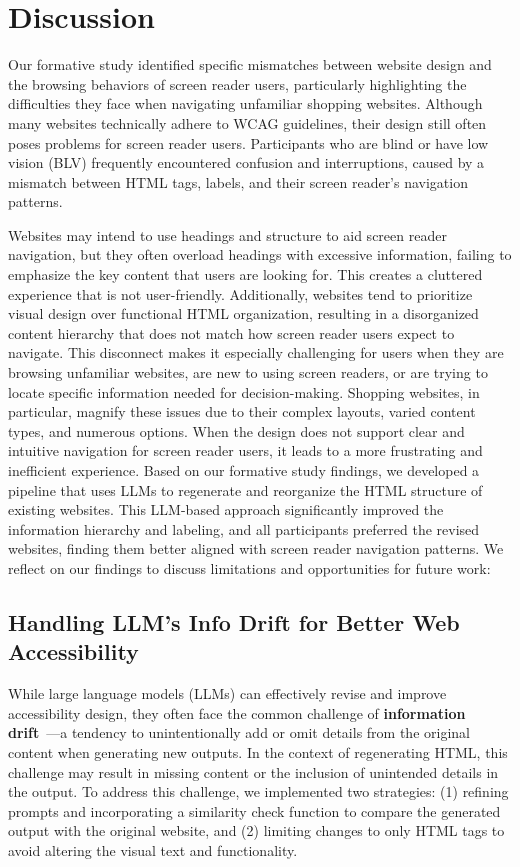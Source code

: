 \section{Discussion}
\label{sec:discuss}



Our formative study identified specific mismatches between website design and the browsing behaviors of screen reader users, particularly highlighting the difficulties they face when navigating unfamiliar shopping websites. Although many websites technically adhere to WCAG guidelines, their design still often poses problems for screen reader users. Participants who are blind or have low vision (BLV) frequently encountered confusion and interruptions, caused by a mismatch between HTML tags, labels, and their screen reader's navigation patterns.

Websites may intend to use headings and structure to aid screen reader navigation, but they often overload headings with excessive information, failing to emphasize the key content that users are looking for. This creates a cluttered experience that is not user-friendly. Additionally, websites tend to prioritize visual design over functional HTML organization, resulting in a disorganized content hierarchy that does not match how screen reader users expect to navigate. This disconnect makes it especially challenging for users when they are browsing unfamiliar websites, are new to using screen readers, or are trying to locate specific information needed for decision-making. Shopping websites, in particular, magnify these issues due to their complex layouts, varied content types, and numerous options. When the design does not support clear and intuitive navigation for screen reader users, it leads to a more frustrating and inefficient experience.
Based on our formative study findings, we developed a pipeline that uses LLMs to regenerate and reorganize the HTML structure of existing websites. This LLM-based approach significantly improved the information hierarchy and labeling, and all participants preferred the revised websites, finding them better aligned with screen reader navigation patterns. We reflect on our findings to discuss limitations and opportunities for future work:


\subsection{Handling LLM’s Info Drift for Better Web Accessibility}
While large language models (LLMs) can effectively revise and improve accessibility design, they often face the common challenge of \textbf{information drift}~\cite{8496795}—a tendency to unintentionally add or omit details from the original content when generating new outputs. In the context of regenerating HTML, this challenge may result in missing content or the inclusion of unintended details in the output. To address this challenge, we implemented two strategies: (1) refining prompts and incorporating a similarity check function to compare the generated output with the original website, and (2) limiting changes to only HTML tags to avoid altering the visual text and functionality.

